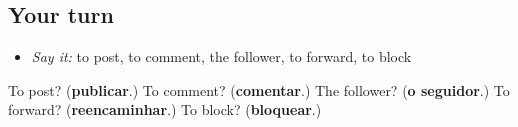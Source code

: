 \subsection*{Your turn}
\begin{itemize}
\raggedright
  \item \emph{Say it:} to post, to comment, the follower, to forward, to block
\end{itemize}

\begin{tcolorbox}[breakable,colback=teal!4,colframe=teal!35!black,title={Before you move on}]
To post? (\textbf{publicar}.) To comment? (\textbf{comentar}.) The follower? (\textbf{o seguidor}.) To forward? (\textbf{reencaminhar}.) To block? (\textbf{bloquear}.)
\end{tcolorbox}
